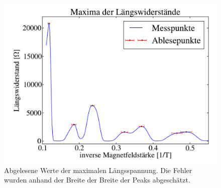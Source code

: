 \documentclass[paper=a4,fontsize=10pt,DIV=18,twocolumn,parskip=half]{scrartcl}
\numberwithin{equation}{section}    %
\begin{document}
\begin{figure}[]
	\begin{center}
		\includegraphics[width=\columnwidth]{Data-Plots/07-maxima_ablesen.pdf}
		\caption{Abgelesene Werte der maximalen Längsspannung. Die Fehler wurden anhand der Breite der Breite der Peaks abgeschätzt.}
		\label{maxima}
	\end{center}
\end{figure}
\end{document}
